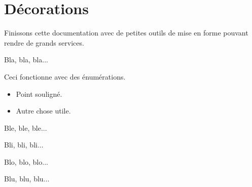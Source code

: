 \documentclass[12pt, a4paper]{article}
\begin{document}
\section{Décorations}

Finissons cette documentation avec de petites outils de mise en forme pouvant rendre de grands services.


\begin{tdoclatex}[sbs]
Bla, bla, bla...

\tdocsep %

Ceci fonctionne avec des énumérations.

\begin{itemize}
    \item Point souligné.

    \item Autre chose utile.
\end{itemize}

\tdocsep %

Ble, ble, ble...

Bli, bli, bli...

\tdocxspace %

Blo, blo, blo...

Blu, blu, blu...

\end{tdoclatex}
\end{document}
